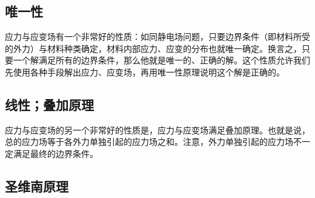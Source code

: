 
\begin{issues}
\issueDraft
\end{issues}

\subsection{唯一性}
应力与应变场有一个非常好的性质：如同静电场问题，只要边界条件（即材料所受的外力）与材料种类确定，材料内部应力、应变的分布也就唯一确定。换言之，只要一个解满足所有的边界条件，那么他就是唯一的、正确的解。这个性质允许我们先使用各种手段解出应力、应变场，再用唯一性原理说明这个解是正确的。

\subsection{线性；叠加原理}
应力与应变场的另一个非常好的性质是，应力与应变场满足叠加原理。也就是说，总的应力场等于各外力单独引起的应力场之和。注意，外力单独引起的应力场不一定满足最终的边界条件。

\subsection{圣维南原理}
